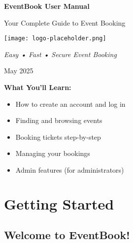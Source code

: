 \documentclass[12pt,a4paper]{article}
\begin{document}
\begin{titlepage}
    \centering
    \vspace*{1.5cm}
    
    {\huge\bfseries\color{primary} EventBook User Manual\par}
    \vspace{0.8cm}
    {\Large\color{gray} Your Complete Guide to Event Booking\par}
    \vspace{2cm}
    
    \texttt{[image: logo-placeholder.png]}
    \vspace{1.5cm}
    
    {\large\itshape Easy • Fast • Secure Event Booking\par}
    \vspace{1cm}
    
    {\large May 2025\par}
    
    \vfill
    
    \begin{tcolorbox}[colback=blue!10!white,colframe=blue!50!black,width=0.8\textwidth]
    \centering
    {\large\bfseries What You'll Learn:\par}
    \vspace{0.5cm}
    \begin{itemize}[leftmargin=2cm]
        \item How to create an account and log in
        \item Finding and browsing events
        \item Booking tickets step-by-step
        \item Managing your bookings
        \item Admin features (for administrators)
    \end{itemize}
    \end{tcolorbox}
    
    \vfill
\end{titlepage}

\newpage
\tableofcontents
\newpage

\section{Getting Started}

\subsection{Welcome to EventBook! 🎉}
\end{document}
